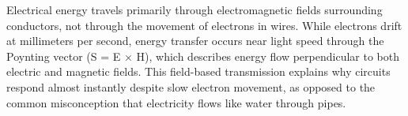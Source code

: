Electrical energy travels primarily through electromagnetic fields surrounding conductors, not through the movement of electrons in wires. While electrons drift at millimeters per second, energy transfer occurs near light speed through the Poynting vector (S = E × H), which describes energy flow perpendicular to both electric and magnetic fields. This field-based transmission explains why circuits respond almost instantly despite slow electron movement, as opposed to the common misconception that electricity flows like water through pipes.
